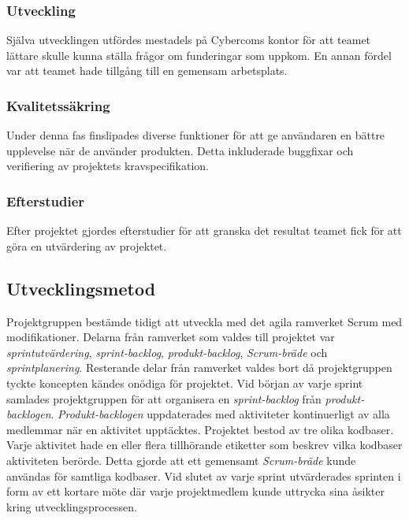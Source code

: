 \subsubsection*{Utveckling}
Själva utvecklingen utfördes mestadels på Cybercoms kontor för att teamet lättare skulle kunna ställa frågor om funderingar som uppkom. En annan fördel var att teamet hade tillgång till en gemensam arbetsplats.

\subsubsection*{Kvalitetssäkring}
Under denna fas finslipades diverse funktioner för att ge användaren en bättre upplevelse när de använder produkten. Detta inkluderade buggfixar och verifiering av projektets kravspecifikation.

\subsubsection*{Efterstudier}
Efter projektet gjordes efterstudier för att granska det resultat teamet fick för att göra en utvärdering av projektet.

\subsection{Utvecklingsmetod}
Projektgruppen bestämde tidigt att utveckla med det agila ramverket Scrum med modifikationer. Delarna från ramverket som valdes till projektet var \textit{sprintutvärdering}, \textit{sprint-backlog}, \textit{produkt-backlog}, \textit{Scrum-bräde} och \textit{sprintplanering}. Resterande delar från ramverket valdes bort då projektgruppen tyckte koncepten kändes onödiga för projektet. Vid början av varje sprint samlades projektgruppen för att organisera en \textit{sprint-backlog} från \textit{produkt-backlogen}. \textit{Produkt-backlogen} uppdaterades med aktiviteter kontinuerligt av alla medlemmar när en aktivitet upptäcktes. Projektet bestod av tre olika kodbaser. Varje aktivitet hade en eller flera tillhörande etiketter som beskrev vilka kodbaser aktiviteten berörde. Detta gjorde att ett gemensamt \textit{Scrum-bräde} kunde användas för samtliga kodbaser. Vid slutet av varje sprint utvärderades sprinten i form av ett kortare möte där varje projektmedlem kunde uttrycka sina åsikter kring utvecklingsprocessen. 

